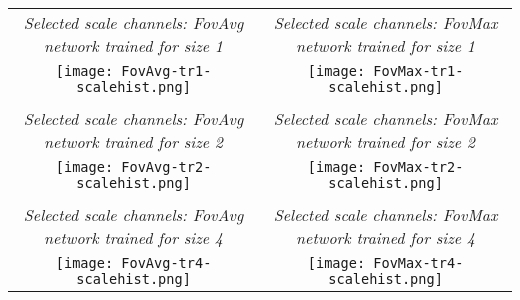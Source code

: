 \documentclass[twocolumn,runningheads]{svjour3}
\begin{document}
\begin{figure*}[hbtp]
\begin{center}
   \begin{tabular}{cc}
     {\em Selected scale channels: FovAvg network trained for size 1}
     & {\em Selected scale channels: FovMax network trained for size 1} \\
     \texttt{[image: FovAvg-tr1-scalehist.png]}
     & \texttt{[image: FovMax-tr1-scalehist.png]}\\
     \\
     {\em Selected scale channels: FovAvg network trained for size 2}
     & {\em Selected scale channels: FovMax network trained for size 2} \\
     \texttt{[image: FovAvg-tr2-scalehist.png]}
     & \texttt{[image: FovMax-tr2-scalehist.png]}\\
      \\
     {\em Selected scale channels: FovAvg network trained for size 4}
     & {\em Selected scale channels: FovMax network trained for size 4} \\
     \texttt{[image: FovAvg-tr4-scalehist.png]}
     & \texttt{[image: FovMax-tr4-scalehist.png]}\\
    \end{tabular}
  \end{center}
  \caption{\emph{Visualisation of the scale selection properties of the  scale-invariant FovAvg and FovMax
    networks, when training the network for each one of the sizes 1, 2 and 4}.
For each testing size, shown on the
    horizontal axis with increasing testing sizes towards the right, the vertical axis displays a histogram of the relative contribution of the scale channels to the winning classification, with the
    lowest scale at the bottom and the highest scale at the top. As can be
    seen from the figures, there is a general tendency of the
    composed classification scheme to select coarser scale levels with
  increasing size of the image structures, in agreement with the
  conceptual similarity to classical methods for scale selection based
on detecting local extrema over scale or performing weighted averaging over
scale of scale-normalised derivative responses. (In these figures, the
resolution parameter on the vertical axis represents the inverse of
scale. Note that the grey-levels in the histograms are not directly
comparable, since the grey-levels for each histogram are normalised
with respect to the maximum and minimum values in that histogram.)}
   \label{fig-sc-sel-FovAvg-FovMax}
 \end{figure*}
\end{document}
